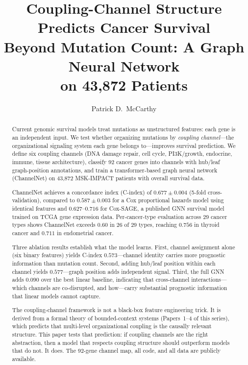 \documentclass[11pt]{article}
\title{Coupling-Channel Structure Predicts Cancer Survival\\Beyond Mutation Count: A Graph Neural Network\\on 43{,}872 Patients}
\author{Patrick D.\ McCarthy}
\date{}
\begin{document}
\maketitle

\begin{abstract}
Current genomic survival models treat mutations as unstructured
features: each gene is an independent input. We test whether
organizing mutations by \emph{coupling channel}---the organizational
signaling system each gene belongs to---improves survival prediction.
We define six coupling channels (DNA damage repair, cell cycle,
PI3K/growth, endocrine, immune, tissue architecture), classify 92
cancer genes into channels with hub/leaf graph-position annotations,
and train a transformer-based graph neural network (ChannelNet) on
43{,}872 MSK-IMPACT patients with overall survival data.

ChannelNet achieves a concordance index (C-index) of
$0.677 \pm 0.004$ (5-fold cross-validation), compared to
$0.587 \pm 0.003$ for a Cox proportional hazards model using
identical features and $0.627$--$0.716$ for Cox-SAGE, a published
GNN survival model trained on TCGA gene expression data.
Per-cancer-type evaluation across 29 cancer types shows
ChannelNet exceeds $0.60$ in 26 of 29 types, reaching $0.756$
in thyroid cancer and $0.711$ in endometrial cancer.

Three ablation results establish what the model learns.
First, channel assignment alone (six binary features) yields
C-index $0.573$---channel identity carries more prognostic
information than mutation count. Second, adding hub/leaf
position within each channel yields $0.577$---graph position
adds independent signal. Third, the full GNN adds $0.090$
over the best linear baseline, indicating that cross-channel
interactions---which channels are co-disrupted, and how---carry
substantial prognostic information that linear models cannot
capture.

The coupling-channel framework is not a black-box feature
engineering trick. It is derived from a formal theory of
bounded-context systems (Papers~1--4 of this series), which
predicts that multi-level organizational coupling is the
causally relevant structure. This paper tests that prediction:
if coupling channels are the right abstraction, then a model
that respects coupling structure should outperform models that
do not. It does. The 92-gene channel map, all code, and all
data are publicly available.
\end{abstract}

\end{document}
